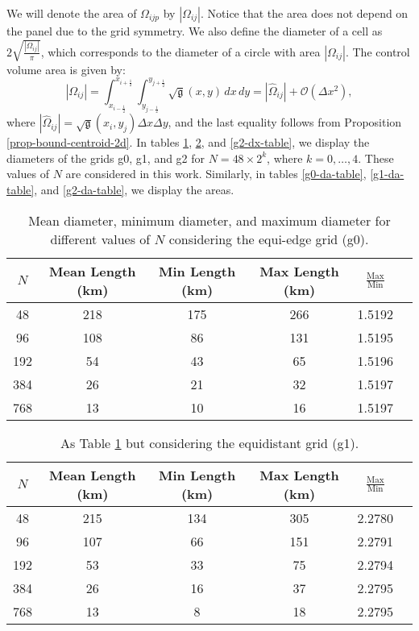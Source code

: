 We will denote the area of $\Omega_{ijp}$ by $|\Omega_{ij}|$.
Notice that the area does not depend on the panel due to the grid symmetry.
We also define the diameter of a cell as $2\sqrt{\frac{|\Omega_{ij}|}{\pi}}$, which corresponds to the diameter of a circle with area $|\Omega_{ij}|$.
The control volume area is given by:
\begin{equation}
	\label{chp4-area}
	|\Omega_{ij}| = \int_{x_{i-\frac{1}{2}}}^{x_{i+\frac{1}{2}}} \int_{y_{j-\frac{1}{2}}}^{y_{j+\frac{1}{2}}}{\sqrt{\mathfrak{g}}(x,y)} \,dx \,dy = 
	|\hat{\Omega}_{ij}| + \mathcal{O}(\Delta x^2),
\end{equation}
where $|\hat{\Omega}_{ij}| = \sqrt{\mathfrak{g}}(x_i,y_j) \Delta x \Delta y$,
and the last equality follows from Proposition \ref{prop-bound-centroid-2d}.
In tables \ref{g0-dx-table}, \ref{g1-dx-table}, and \ref{g2-dx-table},
we display the diameters of the grids g0, g1, and g2 for $N=48\times 2^k$, 
where $k = 0,\ldots, 4$. These values of $N$ are considered in this work.
Similarly, in tables \ref{g0-da-table}, \ref{g1-da-table}, and \ref{g2-da-table}, we display the areas.


\begin{table}[htbp]
    \centering
    \caption{Mean diameter, minimum diameter, and maximum diameter for different values of $N$ considering the equi-edge grid (g0).\label{g0-dx-table}}
    \begin{tabular}{cccccc}
        \toprule
        $N$ & Mean Length (km) & Min Length (km) & Max Length (km) & $\frac{\text{Max}}{\text{Min}}$ \\
        \midrule
        48 & 218 & 175 & 266 & 1.5192 \\
        96 & 108 & 86 & 131 & 1.5195 \\
        192 & 54 & 43 & 65 & 1.5196 \\
        384 & 26 & 21 & 32 & 1.5197 \\
        768 & 13 & 10 & 16 & 1.5197 \\
        \bottomrule
    \end{tabular}
\end{table}

\begin{table}[htbp]
    \centering
    \caption{As Table \ref{g0-dx-table} but considering the equidistant grid (g1). \label{g1-dx-table}}
    \begin{tabular}{cccccc}
        \toprule
        $N$ & Mean Length (km) & Min Length (km) & Max Length (km) & $\frac{\text{Max}}{\text{Min}}$ \\
        \midrule
        48 & 215 & 134 & 305 & 2.2780 \\
        96 & 107 & 66 & 151 & 2.2791 \\
        192 & 53 & 33 & 75 & 2.2794 \\
        384 & 26 & 16 & 37 & 2.2795 \\
        768 & 13 & 8 & 18 & 2.2795 \\
        \bottomrule
    \end{tabular}
\end{table}

